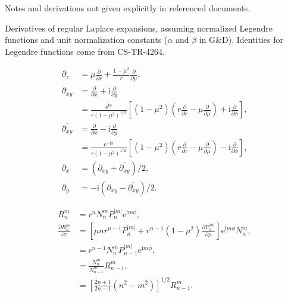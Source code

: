 \documentclass[a4paper,12pt]{article}
\newcommand{\E}{\mathrm{e}}
\newcommand{\J}{\mathrm{i}}
\begin{document}
Notes and derivations not given explicitly in referenced documents.

Derivatives of regular Laplace expansions, assuming normalized
Legendre functions and unit normalization constants ($\alpha$ and
$\beta$ in G\&D). Identities for Legendre functions come from
CS-TR-4264. 

\begin{align}
  \partial_{z} &= \mu\frac{\partial}{\partial r}
  + \frac{1-\mu^{2}}{r}\frac{\partial}{\partial \mu},\\
  \partial_{xy} &= \frac{\partial}{\partial x} + \J
  \frac{\partial}{\partial y}\\
  &=
  \frac{\E^{\J\phi}}{r(1-\mu^{2})^{1/2}}
  \left[
    (1-\mu^{2})
    \left(
      r\frac{\partial}{\partial r}
      -\mu\frac{\partial}{\partial \mu}
    \right)
    + \J\frac{\partial}{\partial \phi}
  \right],\\
  \overline{\partial_{xy}}
  &= \frac{\partial}{\partial x} - \J
  \frac{\partial}{\partial y}\\
  &=
  \frac{\E^{-\J\phi}}{r(1-\mu^{2})^{1/2}}
  \left[
    (1-\mu^{2})
    \left(
      r\frac{\partial}{\partial r}
      -\mu\frac{\partial}{\partial \mu}
    \right)
    - \J\frac{\partial}{\partial \phi}
  \right],\\
  \partial_{x} &= (\partial_{xy}+\overline{\partial_{xy}})/2,\\
  \partial_{y} &= -\J(\partial_{xy}-\overline{\partial_{xy}})/2.
\end{align}

\begin{align}
  R_{n}^{m} &= r^{n} N_{n}^{m}P_{n}^{|m|}\E^{\J m \phi},\\
  \frac{\partial R_{n}^{m}}{\partial z}
  &=
  \left[
    \mu n r^{n-1}P_{n}^{|m|} + r^{n-1}(1-\mu^{2})
    \frac{\partial P_{n}^{|m|}}{\partial \mu}
  \right]\E^{\J m \phi} N_{n}^{m},\\
  &= r^{n-1}N_{n}^{m}P_{n-1}^{|m|}\E^{\J m \phi},\\
  &= \frac{N_{n}^{m}}{N_{n-1}^{m}}R_{n-1}^{m},\\
  &=
  \left[
    \frac{2n+1}{2n-1}
    (n^{2}-m^{2})
  \right]^{1/2}R_{n-1}^{m}.
\end{align}
\end{document}
